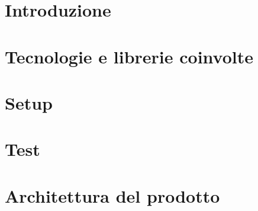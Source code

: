 \documentclass{article}
\begin{document}


\section{Introduzione}
\label{sec:introduzione}


\newpage
\section{Tecnologie e librerie coinvolte}
\label{sec:tech}


\newpage
\section{Setup}
\label{sec:setup}


\newpage
\section{Test}
\label{sec:test}


\newpage
\section{Architettura del prodotto}
\label{sec:arch}

%
%

%
\end{document}

